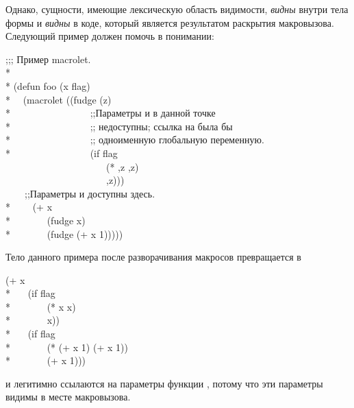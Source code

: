 \begin{defmac}
Однако, сущности, имеющие лексическую область видимости, \emph{видны} внутри
тела формы  и \emph{видны} в коде, который является результатом
раскрытия макровызова. Следующий пример должен помочь в понимании:
\begin{lisp}
;;; Пример macrolet. \\*
\\*
(defun foo (x flag) \\*
~~(macrolet ((fudge (z) \\*
~~~~~~~~~~~~~~~~;;\textrm{Параметры  и  в данной точке} \\*
~~~~~~~~~~~~~~~~;; \textrm{недоступны; ссылка на  была бы} \\*
~~~~~~~~~~~~~~~~;; \textrm{одноименную глобальную переменную.} \\*
~~~~~~~~~~~~~~~~{\Xbq}(if flag \\
~~~~~~~~~~~~~~~~~~~~~(* ,z ,z) \\
~~~~~~~~~~~~~~~~~~~~~,z))) \\
~~~~;;\textrm{Параметры  и  доступны здесь.} \\*
~~~~(+ x \\*
~~~~~~~(fudge x) \\*
~~~~~~~(fudge (+ x 1)))))
\end{lisp}
Тело данного примера после разворачивания макросов превращается в
\begin{lisp}
(+ x \\*
~~~(if flag \\*
~~~~~~~(* x x) \\*
~~~~~~~x)) \\*
~~~(if flag \\*
~~~~~~~(* (+ x 1) (+ x 1)) \\*
~~~~~~~(+ x 1)))
\end{lisp}
 и  легитимно ссылаются на параметры функции
, потому что эти параметры видимы в месте макровызова.
\end{defmac}

